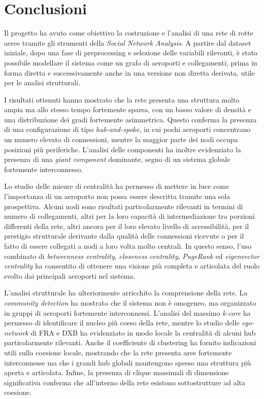 \chapter{Conclusioni}

Il progetto ha avuto come obiettivo la costruzione e l’analisi di una rete di rotte aeree tramite gli strumenti della \textit{Social Network Analysis}. A partire dal dataset iniziale, dopo una fase di preprocessing e selezione delle variabili rilevanti, è stato possibile modellare il sistema come un grafo di aeroporti e collegamenti, prima in forma diretta e successivamente anche in una versione non diretta derivata, utile per le analisi strutturali.

I risultati ottenuti hanno mostrato che la rete presenta una struttura molto ampia ma allo stesso tempo fortemente sparsa, con un basso valore di densità e una distribuzione dei gradi fortemente asimmetrica. Questo conferma la presenza di una configurazione di tipo \textit{hub-and-spoke}, in cui pochi aeroporti concentrano un numero elevato di connessioni, mentre la maggior parte dei nodi occupa posizioni più periferiche. L’analisi delle componenti ha inoltre evidenziato la presenza di una \textit{giant component} dominante, segno di un sistema globale fortemente interconnesso.

Lo studio delle misure di centralità ha permesso di mettere in luce come l’importanza di un aeroporto non possa essere descritta tramite una sola prospettiva. Alcuni nodi sono risultati particolarmente rilevanti in termini di numero di collegamenti, altri per la loro capacità di intermediazione tra porzioni differenti della rete, altri ancora per il loro elevato livello di accessibilità, per il prestigio strutturale derivante dalla qualità delle connessioni ricevute o per il fatto di essere collegati a nodi a loro volta molto centrali. In questo senso, l’uso combinato di \textit{betweenness centrality}, \textit{closeness centrality}, \textit{PageRank} ed \textit{eigenvector centrality} ha consentito di ottenere una visione più completa e articolata del ruolo svolto dai principali aeroporti nel sistema.

L’analisi strutturale ha ulteriormente arricchito la comprensione della rete. La \textit{community detection} ha mostrato che il sistema non è omogeneo, ma organizzato in gruppi di aeroporti fortemente interconnessi. L’analisi del massimo \textit{k-core} ha permesso di identificare il nucleo più coeso della rete, mentre lo studio delle \textit{ego-network} di FRA e DXB ha evidenziato in modo locale la centralità di alcuni hub particolarmente rilevanti. Anche il coefficiente di clustering ha fornito indicazioni utili sulla coesione locale, mostrando che la rete presenta aree fortemente interconnesse ma che i grandi hub globali mantengono spesso una struttura più aperta e articolata. Infine, la presenza di clique massimali di dimensione significativa conferma che all’interno della rete esistono sottostrutture ad alta coesione.

